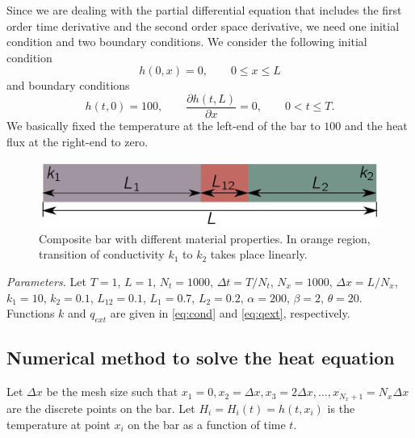 \documentclass[11pt,a4paper]{article}
\newcommand{\p}{\partial }
\begin{document}
Since we are dealing with the partial differential equation that includes the first order time derivative and the second order space derivative, we need one initial condition and two boundary conditions. We consider the following initial condition
\begin{equation}\label{eq:pdeIC}
h(0, x) = 0, \qquad 0 \leq x \leq L
\end{equation}
and boundary conditions
\begin{equation}
h(t, 0) = 100, \qquad \frac{\p h(t, L)}{\p x} = 0, \qquad 0 < t \leq T.
\end{equation}
We basically fixed the temperature at the left-end of the bar to $100$ and the heat flux at the right-end to zero.

\begin{figure}
\centering
\includegraphics[width=0.7\linewidth]{bar}
\caption{Composite bar with different material properties. In orange region, transition of conductivity $k_1$ to $k_2$ takes place linearly.}
\label{fig:bar}
\end{figure}

\vspace{10pt}
\noindent\textit{Parameters.} Let $T = 1$, $L = 1$, $N_t = 1000$, $\Delta t = T/ N_t$, $N_x = 1000$, $\Delta x = L /N_x$, $k_1 = 10$, $k_2 = 0.1$, $L_{12} = 0.1$, $L_1 = 0.7$, $L_2 = 0.2$, $\alpha = 200$, $\beta = 2$, $\theta = 20$. Functions $k$ and $q_{ext}$ are given in \eqref{eq:cond} and \eqref{eq:qext}, respectively.  

\subsection{Numerical method to solve the heat equation}
Let $\Delta x$ be the mesh size such that $x_1 = 0, x_2 = \Delta x, x_3 = 2\Delta x, ..., x_{N_x + 1} = N_x \Delta x$ are the discrete points on the bar. Let $H_i = H_i(t) = h(t, x_i)$ is the temperature at point $x_i$ on the bar as a function of time $t$. 
\end{document}
